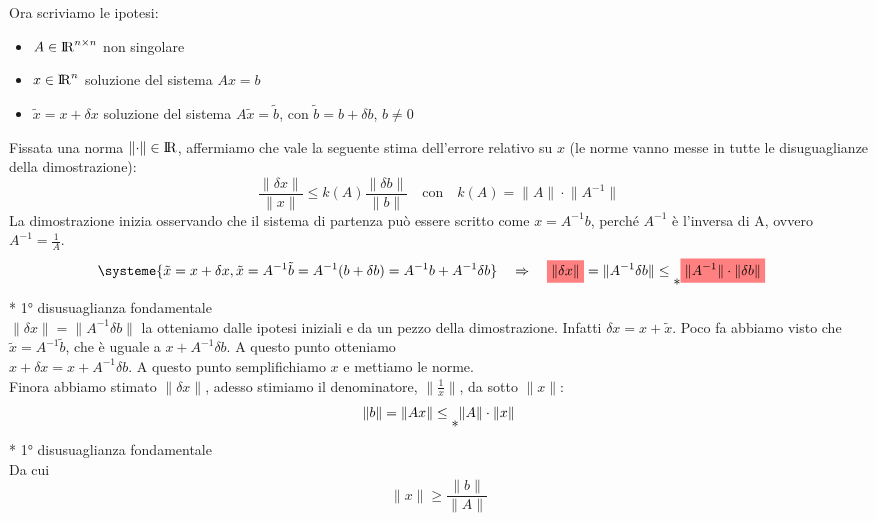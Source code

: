 Ora scriviamo le ipotesi:
\begin{itemize}
    \item $A \in {\rm I\!R}^{n\times n}$ non singolare
    \item $x \in {\rm I\!R}^n$ soluzione del sistema $Ax=b$
    \item $\tilde{x}=x+\delta x$ soluzione del sistema $A\tilde{x}=\tilde{b}$, con $\tilde{b}=b+\delta b$, $b \neq 0$
\end{itemize}
Fissata una norma $\lVert \cdot \rVert \in {\rm I\!R}$, affermiamo che vale la seguente stima dell'errore relativo su $x$ (le norme vanno messe in tutte le disuguaglianze della dimostrazione):\\
\begin{displaymath}
    \frac{\lVert \delta x \rVert}{\lVert x \rVert} \leq k(A)\frac{\lVert \delta b \rVert}{\lVert b\rVert} \quad \text{con} \quad k(A)=\lVert A \rVert \cdot \lVert A^{-1}\rVert
\end{displaymath}
La dimostrazione inizia osservando che il sistema di partenza può essere scritto come $x=A^{-1}b$, perché $A^{-1}$ è l'inversa di A, ovvero $A^{-1}=\frac{1}{A}$.
\begin{align*}
    &\systeme{\tilde{x} = x+\delta x, \tilde{x} = A^{-1}\tilde{b}=A^{-1}(b+\delta b) = A^{-1}b + A^{-1}\delta b}  \quad \Rightarrow \quad \highlightRED{\lVert \delta x \rVert} = \lVert A^{-1}\delta b \rVert \leq \raisebox{-10pt}{*} \highlightRED{\lVert A^{-1} \rVert \cdot \lVert \delta b \rVert}
\end{align*}
* 1° disusuaglianza fondamentale\\
$\lVert \delta x \rVert = \lVert A^{-1}\delta b \rVert$ la otteniamo dalle ipotesi iniziali e da un pezzo della dimostrazione. Infatti $\delta x=x+\tilde{x}$. Poco fa abbiamo visto che $\tilde{x}=A^{-1}\tilde{b}$, che è uguale a $x+A^{-1}\delta b$. A questo punto otteniamo\\ $x+\delta x=x+A^{-1}\delta b$. A questo punto semplifichiamo $x$ e mettiamo le norme.\\
Finora abbiamo stimato $\lVert \delta x \rVert$, adesso stimiamo il denominatore, $\lVert \frac{1}{x} \rVert$, da sotto $\lVert x \rVert$:\\
\begin{displaymath}
    \lVert b \rVert=\lVert Ax \rVert \leq \raisebox{-10pt}{*} \lVert A \rVert \cdot \lVert x \rVert
\end{displaymath}
* 1° disusuaglianza fondamentale\\
Da cui
\begin{displaymath}
    \lVert x \rVert \geq \frac{\lVert b \rVert}{\lVert A \rVert}
\end{displaymath}
